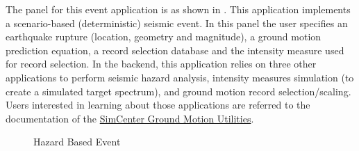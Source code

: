 The panel for this event application is as shown in
. This application implements a scenario-based
(deterministic) seismic event.  In this panel the user specifies an
earthquake rupture (location, geometry and magnitude), a ground motion
prediction equation, a record selection database and the intensity
measure used for record selection. In the backend, this application
relies on three other applications to perform seismic hazard analysis,
intensity measures simulation (to create a simulated target spectrum),
and ground motion record selection/scaling. Users interested in
learning about those applications are referred to the documentation of
the
\href{https://github.com/NHERI-SimCenter/GroundMotionUtilities/blob/master/Readme.md}{SimCenter
  Ground Motion Utilities}.

\begin{figure}[!htbp]
  \caption{Hazard Based Event}
  \label{fig:figure7}
\end{figure}
